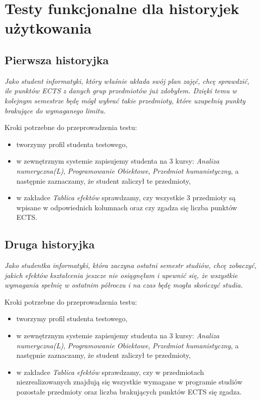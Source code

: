 \documentclass{article}
\begin{document}
\section{Testy funkcjonalne dla historyjek użytkowania}
\subsection{Pierwsza historyjka}
\textit{Jako student informatyki, który właśnie układa swój plan zajęć, chcę sprawdzić, ile punktów ECTS z danych grup przedmiotów już zdobyłem.
Dzięki temu w kolejnym semestrze będę mógł wybrać takie przedmioty, które uzupełnią punkty brakujące do wymaganego limitu.}

\medskip
\noindent Kroki potrzebne do przeprowadzenia testu:
\begin{itemize}
 \item tworzymy profil studenta testowego,
 \item w zewnętrznym systemie zapisujemy studenta na 3 kursy: \textit{Analiza numeryczna(L)}, \textit{Programowanie Obiektowe}, \textit{Przedmiot humanistyczny}, a następnie zaznaczamy, że student zaliczył te przedmioty,
 \item w zakładce \textit{Tablica efektów} sprawdzamy, czy wszystkie 3 przedmioty są wpisane w odpowiednich kolumnach oraz czy zgadza się liczba punktów ECTS.
\end{itemize}


\subsection{Druga historyjka}
\textit{Jako studentka informatyki, która zaczyna ostatni semestr studiów, chcę zobaczyć, jakich efektów kształcenia jeszcze nie osiągnęłam i upewnić się, że wszystkie wymagania spełnię w ostatnim półroczu i na czas będę mogła skończyć studia.}

\medskip
\noindent Kroki potrzebne do przeprowadzenia testu:
\begin{itemize}
 \item tworzymy profil studenta testowego,
 \item w zewnętrznym systemie zapisujemy studenta na 3 kursy: \textit{Analiza numeryczna(L)}, \textit{Programowanie Obiektowe}, \textit{Przedmiot humanistyczny}, a następnie zaznaczamy, że student zaliczył te przedmioty,
 \item w zakładce \textit{Tablica efektów} sprawdzamy, czy w przedmiotach niezrealizowanych znajdują się wszystkie wymagane w programie studiów pozostałe przedmioty oraz
 liczba brakujących punktów ECTS się zgadza.
\end{itemize}
\end{document}
